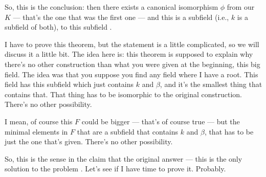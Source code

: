 \begin{speech}[01:22:43 - 01:24:23]
So, this is the conclusion: then there exists a canonical isomorphism $\phi$ from our $K$ --- that's the one that was the first one --- and this is a subfield (i.e., $k$ is a subfield of both), to this subfield .

I have to prove this theorem, but the statement is a little complicated, so we will discuss it a little bit. The idea here is: this theorem is supposed to explain why there's no other construction than what you were given at the beginning, this big field. The idea was that you suppose you find any field where I have a root. This field has this subfield which just contains $k$ and $\beta$, and it's the smallest thing that contains that. That thing has to be isomorphic to the original construction. There's no other possibility.

I mean, of course this $F$ could be bigger --- that's of course true --- but the minimal elements in $F$ that are a subfield that contains $k$ and $\beta$, that has to be just the one that's given. There's no other possibility.

So, this is the sense in the claim that the original answer --- this is the only solution to the problem . Let's see if I have time to prove it. Probably.
\end{speech}

